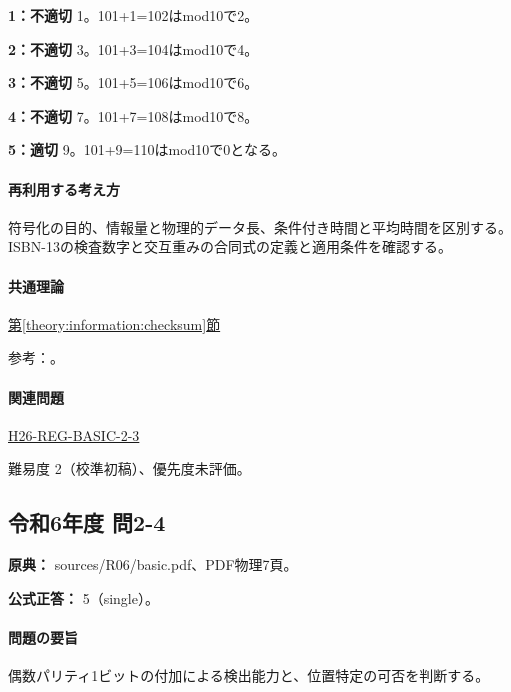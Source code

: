 \noindent\textbf{1：不適切} 1。101+1=\allowbreak{}102はmod10で2。\par

\noindent\textbf{2：不適切} 3。101+3=\allowbreak{}104はmod10で4。\par

\noindent\textbf{3：不適切} 5。101+5=\allowbreak{}106はmod10で6。\par

\noindent\textbf{4：不適切} 7。101+7=\allowbreak{}108はmod10で8。\par

\noindent\textbf{5：適切} 9。101+9=\allowbreak{}110はmod10で0となる。\par

\paragraph{再利用する考え方} 符号化の目的、情報量と物理的データ長、条件付き時間と平均時間を区別する。ISBN-13の検査数字と交互重みの合同式の定義と適用条件を確認する。

\paragraph{共通理論} \hyperref[theory:information:checksum]{第\ref*{theory:information:checksum}節}

\par 参考：\cite{info_isbn}。

\paragraph{関連問題} \hyperref[q:h26-reg-basic-2-3]{H26-REG-BASIC-2-3}

\par 難易度 2（校準初稿）、優先度未評価。

\subsection{令和6年度 問2-4}
\label{q:r06-reg-basic-2-4}

\noindent\textbf{原典：} sources/R06/basic.pdf、PDF物理7頁。

\textbf{公式正答：} 5（single）。

\paragraph{問題の要旨} 偶数パリティ1ビットの付加による検出能力と、位置特定の可否を判断する。

